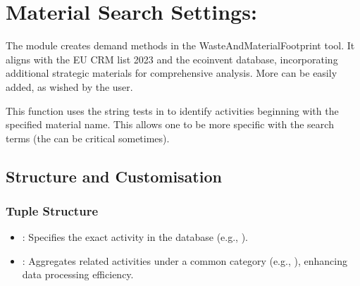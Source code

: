 \documentclass[letterpaper,10pt,english]{sphinxmanual}
\begin{document}
\begin{sphinxVerbatim}[commandchars=\\\{\}]
  
  
  
  
\end{sphinxVerbatim}


\section{Material Search Settings: }
\label{\detokenize{configuration:material-search-settings-queries-materials-py}}
\sphinxAtStartPar
The  module creates demand methods in the WasteAndMaterialFootprint tool. It aligns with the EU CRM list 2023 and the ecoinvent database, incorporating additional strategic materials for comprehensive analysis. More can be easily added, as wished by the user.

\sphinxAtStartPar
This function uses the string tests  in  to identify activities beginning with the specified material name. This allows one to be more specific with the search terms (the \sphinxcode{\sphinxupquote{,}} can be critical sometimes).


\subsection{Structure and Customisation}
\label{\detokenize{configuration:structure-and-customisation}}

\subsubsection{Tuple Structure}
\label{\detokenize{configuration:tuple-structure}}\begin{itemize}
\item {} 
\sphinxAtStartPar
{}: Specifies the exact activity in the database (e.g., ).

\item {} 
\sphinxAtStartPar
{}: Aggregates related activities under a common category (e.g., ), enhancing data processing efficiency.

\end{itemize}
\end{document}
